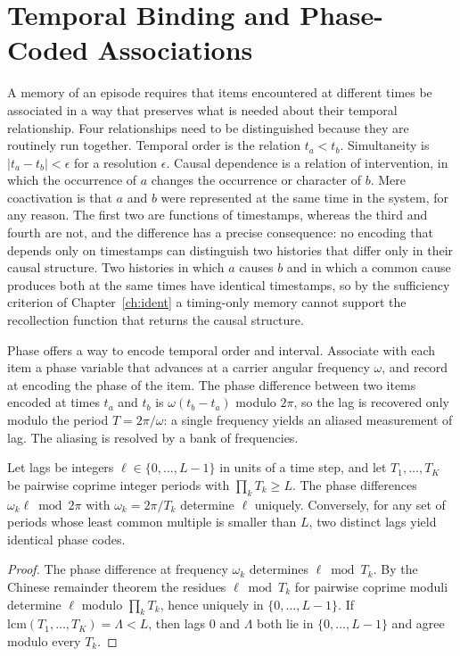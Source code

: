 \chapter{Temporal Binding and Phase-Coded Associations}\label{ch:binding}

A memory of an episode requires that items encountered at different times be associated in a way that preserves what is needed about their temporal relationship. Four relationships need to be distinguished because they are routinely run together. Temporal order is the relation $t_a<t_b$. Simultaneity is $|t_a-t_b|<\epsilon$ for a resolution $\epsilon$. Causal dependence is a relation of intervention, in which the occurrence of $a$ changes the occurrence or character of $b$. Mere coactivation is that $a$ and $b$ were represented at the same time in the system, for any reason. The first two are functions of timestamps, whereas the third and fourth are not, and the difference has a precise consequence: no encoding that depends only on timestamps can distinguish two histories that differ only in their causal structure. Two histories in which $a$ causes $b$ and in which a common cause produces both at the same times have identical timestamps, so by the sufficiency criterion of Chapter~\ref{ch:ident} a timing-only memory cannot support the recollection function that returns the causal structure.

Phase offers a way to encode temporal order and interval. Associate with each item a phase variable that advances at a carrier angular frequency $\omega$, and record at encoding the phase of the item. The phase difference between two items encoded at times $t_a$ and $t_b$ is $\omega(t_b-t_a)$ modulo $2\pi$, so the lag is recovered only modulo the period $T=2\pi/\omega$: a single frequency yields an aliased measurement of lag. The aliasing is resolved by a bank of frequencies.

\begin{proposition}\label{prop:crt}
Let lags be integers $\ell\in\{0,\dots,L-1\}$ in units of a time step, and let $T_1,\dots,T_K$ be pairwise coprime integer periods with $\prod_kT_k\ge L$. The phase differences $\omega_k\ell\bmod 2\pi$ with $\omega_k=2\pi/T_k$ determine $\ell$ uniquely. Conversely, for any set of periods whose least common multiple is smaller than $L$, two distinct lags yield identical phase codes.
\end{proposition}

\begin{proof}
The phase difference at frequency $\omega_k$ determines $\ell\bmod T_k$. By the Chinese remainder theorem the residues $\ell\bmod T_k$ for pairwise coprime moduli determine $\ell$ modulo $\prod_kT_k$, hence uniquely in $\{0,\dots,L-1\}$. If $\mathrm{lcm}(T_1,\dots,T_K)=\Lambda<L$, then lags $0$ and $\Lambda$ both lie in $\{0,\dots,L-1\}$ and agree modulo every $T_k$.
\end{proof}

